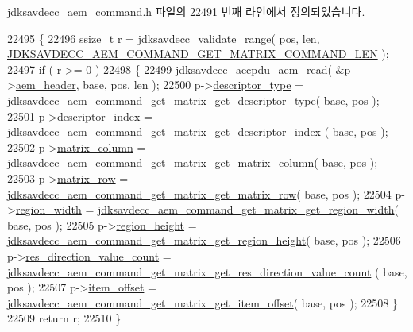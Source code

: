 jdksavdecc\+\_\+aem\+\_\+command.\+h 파일의 22491 번째 라인에서 정의되었습니다.


\begin{DoxyCode}
22495 \{
22496     ssize\_t r = \hyperlink{group__util_ga9c02bdfe76c69163647c3196db7a73a1}{jdksavdecc\_validate\_range}( pos, len, 
      \hyperlink{group__command__get__matrix_ga25f92589e7e01153802fa959751695e7}{JDKSAVDECC\_AEM\_COMMAND\_GET\_MATRIX\_COMMAND\_LEN} );
22497     \textcolor{keywordflow}{if} ( r >= 0 )
22498     \{
22499         \hyperlink{group__aecpdu__aem_gae2421015dcdce745b4f03832e12b4fb6}{jdksavdecc\_aecpdu\_aem\_read}( &p->\hyperlink{structjdksavdecc__aem__command__get__matrix_ae1e77ccb75ff5021ad923221eab38294}{aem\_header}, base, pos, len );
22500         p->\hyperlink{structjdksavdecc__aem__command__get__matrix_ab7c32b6c7131c13d4ea3b7ee2f09b78d}{descriptor\_type} = 
      \hyperlink{group__command__get__matrix_gadecbe0ab8669b005acd23a62a0d4d077}{jdksavdecc\_aem\_command\_get\_matrix\_get\_descriptor\_type}(
       base, pos );
22501         p->\hyperlink{structjdksavdecc__aem__command__get__matrix_a042bbc76d835b82d27c1932431ee38d4}{descriptor\_index} = 
      \hyperlink{group__command__get__matrix_gae06827e874371135ab799f617f6723b3}{jdksavdecc\_aem\_command\_get\_matrix\_get\_descriptor\_index}
      ( base, pos );
22502         p->\hyperlink{structjdksavdecc__aem__command__get__matrix_aa7db0d3d8cd5b895d1f9bf81b816fd66}{matrix\_column} = 
      \hyperlink{group__command__get__matrix_ga8b6906bbd62ce8d5f486ed135860399f}{jdksavdecc\_aem\_command\_get\_matrix\_get\_matrix\_column}( 
      base, pos );
22503         p->\hyperlink{structjdksavdecc__aem__command__get__matrix_a8cb269dcca919ec8232ec33a09477c07}{matrix\_row} = 
      \hyperlink{group__command__get__matrix_ga98cce114fc9450f88849c55c12d53578}{jdksavdecc\_aem\_command\_get\_matrix\_get\_matrix\_row}( base, pos
       );
22504         p->\hyperlink{structjdksavdecc__aem__command__get__matrix_a87453b735ebc871f58f507139df28b89}{region\_width} = 
      \hyperlink{group__command__get__matrix_ga802736a4c35bb167c36df5d2ae3e8dec}{jdksavdecc\_aem\_command\_get\_matrix\_get\_region\_width}( base,
       pos );
22505         p->\hyperlink{structjdksavdecc__aem__command__get__matrix_afac2ca21b44ee4f90b555f2609321c60}{region\_height} = 
      \hyperlink{group__command__get__matrix_ga8ac7ccafd277b7fc4bc0166b0aa787b6}{jdksavdecc\_aem\_command\_get\_matrix\_get\_region\_height}( 
      base, pos );
22506         p->\hyperlink{structjdksavdecc__aem__command__get__matrix_a0f34ba05787e5027402de5f250c3a5a6}{res\_direction\_value\_count} = 
      \hyperlink{group__command__get__matrix_ga5976272b432a59d63311e46bbea9f694}{jdksavdecc\_aem\_command\_get\_matrix\_get\_res\_direction\_value\_count}
      ( base, pos );
22507         p->\hyperlink{structjdksavdecc__aem__command__get__matrix_afbb15486d86fc9c3680a6864ddbc029b}{item\_offset} = 
      \hyperlink{group__command__get__matrix_gadb6b13e98e77be3113e994f541690d21}{jdksavdecc\_aem\_command\_get\_matrix\_get\_item\_offset}( base, 
      pos );
22508     \}
22509     \textcolor{keywordflow}{return} r;
22510 \}
\end{DoxyCode}


